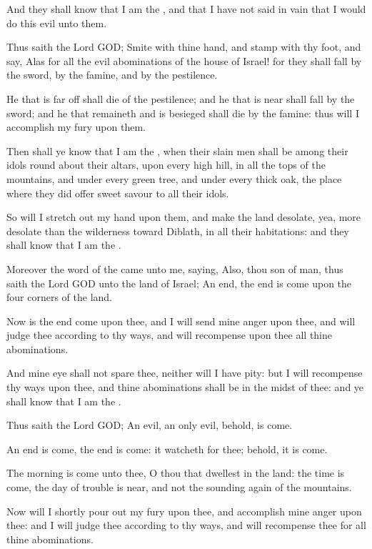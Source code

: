 \Verse And they shall know that I am the \LORD, and that I have not said in vain that I would do this evil unto them.

\Verse Thus saith the Lord GOD; Smite with thine hand, and stamp with thy foot, and say, Alas for all the evil abominations of the house of Israel! for they shall fall by the sword, by the famine, and by the pestilence.

\Verse He that is far off shall die of the pestilence; and he that is near shall fall by the sword; and he that remaineth and is besieged shall die by the famine: thus will I accomplish my fury upon them.

\Verse Then shall ye know that I am the \LORD, when their slain men shall be among their idols round about their altars, upon every high hill, in all the tops of the mountains, and under every green tree, and under every thick oak, the place where they did offer sweet savour to all their idols.

\Verse So will I stretch out my hand upon them, and make the land desolate, yea, more desolate than the wilderness toward Diblath, in all their habitations: and they shall know that I am the \LORD.


\Chapter
\Verse Moreover the word of the \LORD came unto me, saying, \Verse Also, thou son of man, thus saith the Lord GOD unto the land of Israel; An end, the end is come upon the four corners of the land.

\Verse Now is the end come upon thee, and I will send mine anger upon thee, and will judge thee according to thy ways, and will recompense upon thee all thine abominations.

\Verse And mine eye shall not spare thee, neither will I have pity: but I will recompense thy ways upon thee, and thine abominations shall be in the midst of thee: and ye shall know that I am the \LORD.

\Verse Thus saith the Lord GOD; An evil, an only evil, behold, is come.

\Verse An end is come, the end is come: it watcheth for thee; behold, it is come.

\Verse The morning is come unto thee, O thou that dwellest in the land: the time is come, the day of trouble is near, and not the sounding again of the mountains.

\Verse Now will I shortly pour out my fury upon thee, and accomplish mine anger upon thee: and I will judge thee according to thy ways, and will recompense thee for all thine abominations.

